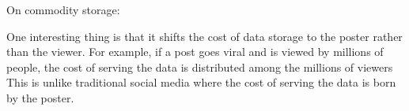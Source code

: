 On commodity storage:

One interesting thing is that it shifts the cost of data storage to the poster
rather than the viewer.
For example, if a post goes viral and is viewed by millions of people,
the cost of serving the data is distributed among the millions of viewers
This is unlike traditional social media where the cost of serving the data
is born by the poster.

